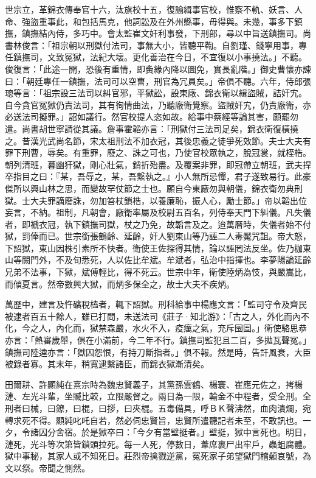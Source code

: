 世宗立，革錦衣傳奉官十六，汰旗校十五，復諭緝事官校，惟察不軌、妖言、人命、強盜重事此，和包括馬克，他詞訟及在外州縣事，毋得與。未幾，事多下鎮撫，鎮撫結內侍，多巧中。會太監崔文奸利事發，下刑部，尋以中旨送鎮撫司。尚書林俊言：「祖宗朝以刑獄付法司，事無大小，皆聽平鞫。自劉瑾、錢寧用事，專任鎮撫司，文致冤獄，法紀大壞。更化善治在今日，不宜復以小事撓法。」不聽。俊復言：「此途一開，恐後有重情，即夤緣內降以圖免，實長亂階。」御史曹懷亦諫曰：「朝廷專任一鎮撫，法司可以空曹，刑官為冗員矣。」帝俱不聽。六年，侍郎張璁等言：「祖宗設三法司以糾官邪，平獄訟，設東廠、錦衣衛以緝盜賊，詰奸宄。自今貪官冤獄仍責法司，其有徇情曲法，乃聽廠衛覺察。盜賊奸宄，仍責廠衛，亦必送法司擬罪。」詔如議行。然官校提人恣如故。給事中蔡經等論其害，願罷勿遣。尚書胡世寧請從其議。詹事霍韜亦言：「刑獄付三法司足矣，錦衣衛復橫撓之。昔漢光武尚名節，宋太祖刑法不加衣冠，其後忠義之徒爭死效節。夫士大夫有罪下刑曹，辱矣。有重罪，廢之、誅之可也，乃使官校眾執之，脫冠裳，就桎梏。朝列清班，暮幽犴獄，剛心壯氣，銷折殆盡。及覆案非罪，即冠帶立朝班，武夫捍卒指目之曰：『某，吾辱之，某，吾繫執之。』小人無所忌憚，君子遂致易行。此豪傑所以興山林之思，而變故罕仗節之士也。願自今東廠勿與朝儀，錦衣衛勿典刑獄。士大夫罪謫廢誅，勿加笞杖鎖梏，以養廉恥，振人心，勵士節。」帝以韜出位妄言，不納。祖制，凡朝會，廠衛率屬及校尉五百名，列侍奉天門下糾儀。凡失儀者，即褫衣冠，執下鎮撫司獄，杖之乃免，故韜言及之。迨萬曆時，失儀者始不付獄，罰俸而已。世宗銜張鶴齡、延齡，奸人劉東山等乃誣二人毒魘咒詛。帝大怒，下詔獄，東山因株引素所不快者。衛使王佐探得其情，論以誣罔法反坐。佐乃枷東山等闕門外，不及旬悉死，人以佐比牟斌。牟斌者，弘治中指揮也。李夢陽論延齡兄弟不法事，下獄，斌傅輕比，得不死云。世宗中年，衛使陸炳為忮，與嚴嵩比，而傾夏言。然帝數興大獄，而炳多保全之，故士大夫不疾炳。

萬歷中，建言及忤礦稅榼者，輒下詔獄。刑科給事中楊應文言：「監司守令及齊民被逮者百五十餘人，雖已打問，未送法司《莊子·知北游》：「古之人，外化而內不化，今之人，內化而，獄禁森嚴，水火不入，疫癘之氣，充斥囹圄。」衛使駱思恭亦言：「熱審歲舉，俱在小滿前，今二年不行。鎮撫司監犯且二百，多拋瓦聲冤。」鎮撫司陸逵亦言：「獄囚怨恨，有持刀斷指者。」俱不報。然是時，告訐風衰，大臣被錄者寡。其末年，稍寬逮繫諸臣，而錦衣獄漸清矣。

田爾耕、許顯純在熹宗時為魏忠賢義子，其黨孫雲鶴、楊寰、崔應元佐之，拷楊漣、左光斗輩，坐贓比較，立限嚴督之。兩日為一限，輸金不中程者，受全刑。全刑者曰械，曰鐐，曰棍，曰拶，曰夾棍。五毒備具，呼ＢＫ聲沸然，血肉潰爛，宛轉求死不得。顯純叱吒自若，然必伺忠賢旨，忠賢所遣聽記者未至，不敢訊也。一夕，令諸囚分舍宿。於是獄卒曰：「今夕有當壁挺者。」壁挺，獄中言死也。明日，漣死，光斗等次第皆鎖頭拉死。每一人死，停數日，葦席裹尸出牢戶，蟲蛆腐體。獄中事秘，其家人或不知死日。莊烈帝擒戮逆黨，冤死家子弟望獄門稽顙哀號，為文以祭。帝聞之惻然。

